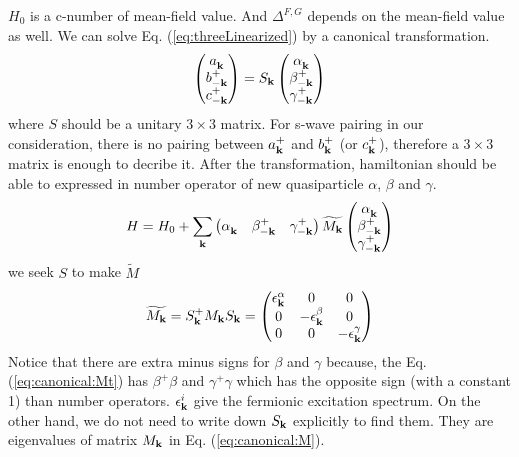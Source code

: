 $H_{0}$ is a c-number of mean-field value.  And $\Delta^{F,G}$ depends on the mean-field value as well.  We can solve Eq. (\ref{eq:threeLinearized}) by a canonical transformation.  
\begin{equation}
  \begin{pmatrix}a^{}_{\mathbf{k}}\\b^{+}_{-\mathbf{k}}\\c^{+}_{-\mathbf{k}}\end{pmatrix}=S_{\mathbf{k}}  
  \begin{pmatrix}\alpha^{}_{\mathbf{k}}\\\beta^{+}_{-\mathbf{k}}\\\gamma^{+}_{-\mathbf{k}}\end{pmatrix}
  \end{equation}
where $S$ should be a unitary $3\times3$ matrix.  For s-wave pairing in our consideration, there is no pairing between $a^{+}_{\mathbf{k}}$ and $b^{+}_{\mathbf{k}}$ (or $c^{+}_{\mathbf{k}}$), therefore a $3\times3$ matrix is enough to decribe it.  After the transformation, hamiltonian should be able to expressed in number operator of new quasiparticle $\alpha$, $\beta$ and $\gamma$.   
\begin{equation}\label{eq:canonical:Mt}
H=H_{0}+\sum_{\mathbf{k}}
 \begin{pmatrix}\alpha^{}_{\mathbf{k}}&\beta^{+}_{-\mathbf{k}}&\gamma^{+}_{-\mathbf{k}}\end{pmatrix}
\widetilde{M_{\mathbf{k}}}
   \begin{pmatrix}\alpha^{}_{\mathbf{k}}\\\beta^{+}_{-\mathbf{k}}\\\gamma^{+}_{-\mathbf{k}}\end{pmatrix}
\end{equation}
we seek $S$ to make $\widetilde{M}$
\begin{equation}
 \widetilde{M_{\mathbf{k}}}=S^{+}_{\mathbf{k}}M_{\mathbf{k}}S_{\mathbf{k}}=
 \begin{pmatrix}\epsilon^{\alpha}_{\mathbf{k}}&0&0\\0&-\epsilon^{\beta}_{\mathbf{k}}&0\\0&0&-\epsilon^{\gamma}_{\mathbf{k}}\end{pmatrix}
 \end{equation}
Notice that there are extra minus signs for $\beta$ and $\gamma$ because, the Eq. (\ref{eq:canonical:Mt}) has $\beta^{+}\beta$ and $\gamma^{+}\gamma$ which has the opposite sign (with a constant 1) than number operators.  $\epsilon^{i}_{\mathbf{k}}$ give the fermionic excitation spectrum.  On the other hand, we do not need to write down $S_{\mathbf{k}}$ explicitly to find them.  They are eigenvalues of matrix $M_{\mathbf{k}}$ in Eq. (\ref{eq:canonical:M}). 

